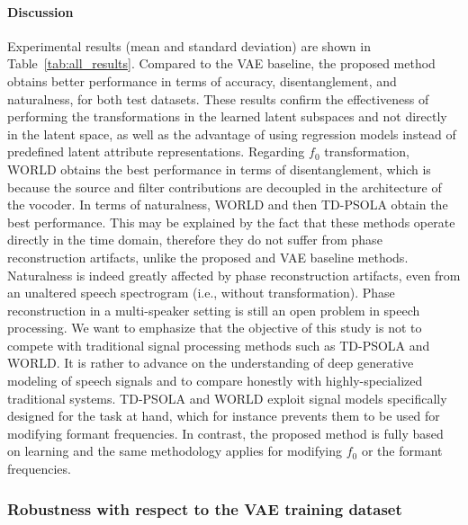 \documentclass[review]{elsarticle}
\begin{document}
\paragraph{Discussion} Experimental results (mean and standard deviation) are shown in Table~\ref{tab:all_results}. Compared to the VAE baseline, the proposed method obtains better performance in terms of accuracy, disentanglement, and naturalness, for both test datasets.
These results confirm the effectiveness of performing the transformations in the learned latent subspaces and not directly in the latent space, as well as the advantage of using regression models instead of predefined latent attribute representations. 
Regarding $f_0$ transformation, WORLD obtains the best performance in terms of disentanglement, which is because the source and filter contributions are decoupled in the architecture of the vocoder. In terms of naturalness, WORLD and then TD-PSOLA obtain the best performance. This may be explained by the fact that these methods operate directly in the time domain, therefore they do not suffer from phase reconstruction artifacts, unlike the proposed and VAE baseline methods. Naturalness is indeed greatly affected by phase reconstruction artifacts, even from an unaltered speech spectrogram (i.e., without transformation). Phase reconstruction in a multi-speaker setting is still an open problem in speech processing. We want to emphasize that the objective of this study is not to compete with traditional signal processing methods such as TD-PSOLA and WORLD. It is rather to advance on the understanding of deep generative modeling of speech signals and to compare honestly with highly-specialized traditional systems. TD-PSOLA and WORLD exploit signal models specifically designed for the task at hand, which for instance prevents them to be used for modifying formant frequencies. In contrast, the proposed method is fully based on learning and the same methodology applies for modifying $f_0$ or the formant frequencies.

\subsubsection{Robustness with respect to the VAE training dataset}
\label{additional_results_otherdataset}
\end{document}
